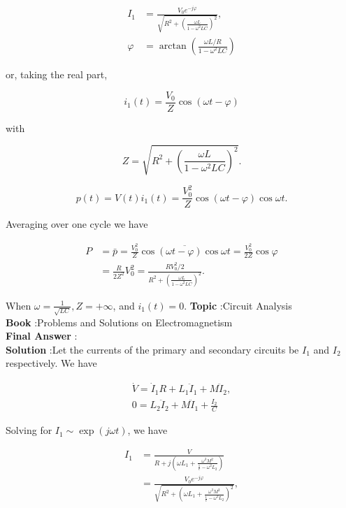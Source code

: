 \documentclass[10pt]{article}
\begin{document}
$$
\begin{aligned}
I_{1} &=\frac{V_{0} e^{-j \varphi}}{\sqrt{R^{2}+\left(\frac{\omega L}{1-\omega^{2} L C}\right)^{2}}}, \\
\varphi &=\arctan \left(\frac{\omega L / R}{1-\omega^{2} L C}\right)
\end{aligned}
$$

or, taking the real part,

$$
i_{1}(t)=\frac{V_{0}}{Z} \cos (\omega t-\varphi)
$$

with

$$
Z=\sqrt{R^{2}+\left(\frac{\omega L}{1-\omega^{2} L C}\right)^{2}} .
$$



$$
p(t)=V(t) i_{1}(t)=\frac{V_{0}^{2}}{Z} \cos (\omega t-\varphi) \cos \omega t .
$$

Averaging over one cycle we have

$$
\begin{aligned}
P &=\bar{p}=\frac{V_{0}^{2}}{Z} \overline{\cos (\omega t-\varphi) \cos \omega t}=\frac{V_{0}^{2}}{2 Z} \cos \varphi \\
&=\frac{R}{2 Z^{2}} V_{0}^{2}=\frac{R V_{0}^{2} / 2}{R^{2}+\left(\frac{\omega L}{1-\omega^{2} L C}\right)^{2}} .
\end{aligned}
$$

 When $\omega=\frac{1}{\sqrt{L C}}, Z=+\infty$, and $i_{1}(t)=0$.
\textbf{Topic} :Circuit Analysis\\
\textbf{Book} :Problems and Solutions on Electromagnetism\\
\textbf{Final Answer} :\\


\textbf{Solution} :Let the currents of the primary and secondary circuits be $I_{1}$ and $I_{2}$ respectively. We have

$$
\begin{gathered}
\dot{V}=\dot{I}_{1} R+L_{1} \ddot{I}_{1}+M \ddot{I}_{2}, \\
0=L_{2} \ddot{I}_{2}+M \ddot{I}_{1}+\frac{I_{2}}{C}
\end{gathered}
$$

Solving for $I_{1} \sim \exp (j \omega t)$, we have

$$
\begin{aligned}
I_{1} &=\frac{V}{R+j\left(\omega L_{1}+\frac{\omega^{3} M^{2}}{\frac{1}{c}-\omega^{2} L_{2}}\right)} \\
&=\frac{V_{0} e^{-j \varphi}}{\sqrt{R^{2}+\left(\omega L_{1}+\frac{\omega^{3} M^{2}}{\frac{1}{c}-\omega^{2} L_{2}}\right)^{2}}},
\end{aligned}
$$
\end{document}

